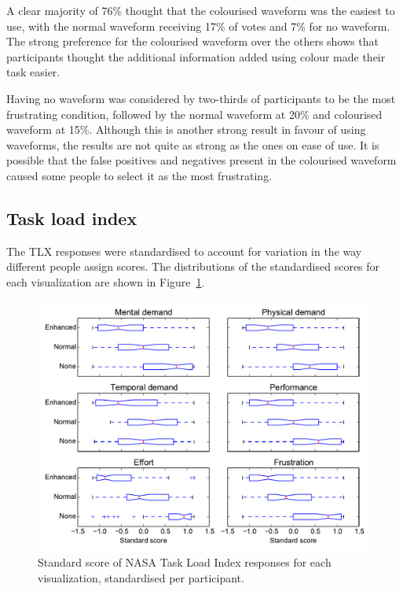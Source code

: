 A clear majority of 76\% thought that the colourised waveform was the easiest to use, with the normal waveform receiving
17\% of votes and 7\% for no waveform.  The strong preference for the colourised waveform over the others shows that
participants thought the additional information added using colour made their task easier.

Having no waveform was considered by two-thirds of participants to be the most frustrating condition, followed by the
normal waveform at 20\% and colourised waveform at 15\%. Although this is another strong result in favour of using
waveforms, the results are not quite as strong as the ones on ease of use. It is possible that the false positives and
negatives present in the colourised waveform caused some people to select it as the most frustrating.

\subsection{Task load index}
The TLX responses were standardised to account for variation in the way different people assign scores. The
distributions of the standardised scores for each visualization are shown in Figure~\ref{fig:tlx}.

\begin{figure}[p]
  \centering
  \includegraphics[width=\textwidth]{figs/tlx-std.pdf}
  \caption{Standard score of NASA Task Load Index responses for each visualization, standardised per participant.}
  \label{fig:tlx}
\end{figure}


